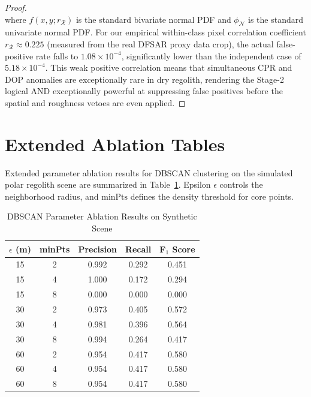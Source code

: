 \documentclass[10pt,conference]{IEEEtran}
\begin{document}
\begin{proof}
\begin{equation*}
\end{equation*}
where $f(x, y; r_{\mathcal{R}})$ is the standard bivariate normal PDF and $\phi_{\mathcal{N}}$ is the standard univariate normal PDF. For our empirical within-class pixel correlation coefficient $r_{\mathcal{R}} \approx 0.225$ (measured from the real DFSAR proxy data crop), the actual false-positive rate falls to $1.08 \times 10^{-4}$, significantly lower than the independent case of $5.18 \times 10^{-4}$. This weak positive correlation means that simultaneous CPR and DOP anomalies are exceptionally rare in dry regolith, rendering the Stage-2 logical AND exceptionally powerful at suppressing false positives before the spatial and roughness vetoes are even applied.
\end{proof}


\section{Extended Ablation Tables}

Extended parameter ablation results for DBSCAN clustering on the simulated polar regolith scene are summarized in Table~\ref{tab:dbscan_ablation}. Epsilon $\epsilon$ controls the neighborhood radius, and $\text{minPts}$ defines the density threshold for core points.

\begin{table}[htbp]
\caption{DBSCAN Parameter Ablation Results on Synthetic Scene}
\label{tab:dbscan_ablation}
\centering
\begin{tabular}{ccccc}
\toprule
$\epsilon$ (m) & minPts & Precision & Recall & F$_1$ Score \\
\midrule
15 & 2 & 0.992 & 0.292 & 0.451 \\
15 & 4 & 1.000 & 0.172 & 0.294 \\
15 & 8 & 0.000 & 0.000 & 0.000 \\
\midrule
30 & 2 & 0.973 & 0.405 & 0.572 \\
30 & 4 & 0.981 & 0.396 & 0.564 \\
30 & 8 & 0.994 & 0.264 & 0.417 \\
\midrule
60 & 2 & 0.954 & 0.417 & 0.580 \\
60 & 4 & 0.954 & 0.417 & 0.580 \\
60 & 8 & 0.954 & 0.417 & 0.580 \\
\bottomrule
\end{tabular}
\end{table}
\end{document}
